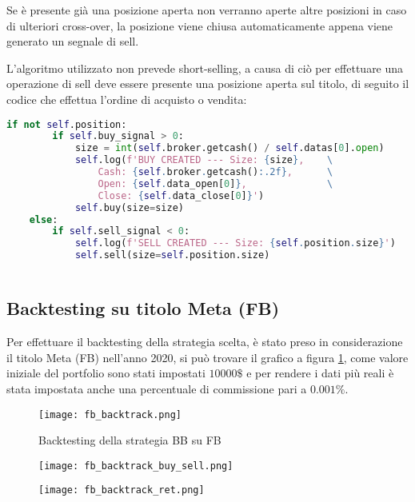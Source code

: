 Se è presente già una posizione aperta non verranno aperte altre posizioni in caso di ulteriori cross-over, la posizione viene chiusa automaticamente
appena viene generato un segnale di sell.

L'algoritmo utilizzato non prevede short-selling, a causa di ciò per effettuare una operazione di sell deve essere presente una posizione aperta sul titolo, di seguito il codice che effettua l'ordine di acquisto o vendita:

\begin{lstlisting}[showstringspaces=false, language=Python]
    if not self.position:
        if self.buy_signal > 0:
            size = int(self.broker.getcash() / self.datas[0].open)
            self.log(f'BUY CREATED --- Size: {size},    \
                Cash: {self.broker.getcash():.2f},      \
                Open: {self.data_open[0]},              \
                Close: {self.data_close[0]}')
            self.buy(size=size)
    else:
        if self.sell_signal < 0:
            self.log(f'SELL CREATED --- Size: {self.position.size}')
            self.sell(size=self.position.size)
                 
\end{lstlisting}

\pagebreak

\subsection{Backtesting su titolo Meta (FB)}

Per effettuare il backtesting della strategia scelta, è stato preso in considerazione il titolo Meta (FB) nell'anno
2020, si può trovare il grafico a figura \ref{fig:fb_backtest}, come valore iniziale del portfolio sono stati impostati
$10000\$$ e per rendere i dati più reali è stata impostata anche una percentuale di commissione pari a $0.001\%$.

\begin{figure}[ht]
    \centering
    \texttt{[image: fb\_backtrack.png]}
    \caption{Backtesting della strategia BB su FB}
    \label{fig:fb_backtest}
\end{figure}

\begin{figure}[ht]
    \centering
    \begin{minipage}{.5\textwidth}
        \centering
        \vspace{2.35cm}
        \texttt{[image: fb\_backtrack\_buy\_sell.png]}
        \label{fig:fb_backtr_log}
    \end{minipage}%
    \begin{minipage}{.5\textwidth}
        \centering
        \texttt{[image: fb\_backtrack\_ret.png]}
        \label{fig:fb_backtr_ret}
    \end{minipage}
\end{figure}

